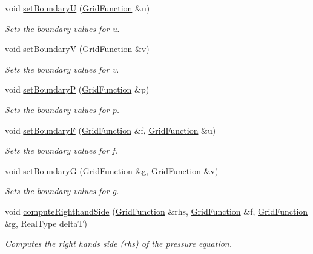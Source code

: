 \begin{DoxyCompactItemize}
void \hyperlink{class_computation_a9f8ae5f9990bc96f6cbe68e7965f8f5e}{set\-Boundary\-U} (\hyperlink{class_grid_function}{Grid\-Function} \&u)
\begin{DoxyCompactList}\small\item\em Sets the boundary values for u. \end{DoxyCompactList}\item 
void \hyperlink{class_computation_a95a948a82d9574cdee21e61bfca76f94}{set\-Boundary\-V} (\hyperlink{class_grid_function}{Grid\-Function} \&v)
\begin{DoxyCompactList}\small\item\em Sets the boundary values for v. \end{DoxyCompactList}\item 
void \hyperlink{class_computation_a43d0b65ed6493243d7a7eb6a47f0d93c}{set\-Boundary\-P} (\hyperlink{class_grid_function}{Grid\-Function} \&p)
\begin{DoxyCompactList}\small\item\em Sets the boundary values for p. \end{DoxyCompactList}\item 
void \hyperlink{class_computation_a9a5f1ebff2fb7f3fc4690c26b34ad2a8}{set\-Boundary\-F} (\hyperlink{class_grid_function}{Grid\-Function} \&f, \hyperlink{class_grid_function}{Grid\-Function} \&u)
\begin{DoxyCompactList}\small\item\em Sets the boundary values for f. \end{DoxyCompactList}\item 
void \hyperlink{class_computation_ae4105e9c89e6a8d28f79f13dcea1df26}{set\-Boundary\-G} (\hyperlink{class_grid_function}{Grid\-Function} \&g, \hyperlink{class_grid_function}{Grid\-Function} \&v)
\begin{DoxyCompactList}\small\item\em Sets the boundary values for g. \end{DoxyCompactList}\item 
void \hyperlink{class_computation_a6596833e2001d82c870fd09fa4d6d566}{compute\-Righthand\-Side} (\hyperlink{class_grid_function}{Grid\-Function} \&rhs, \hyperlink{class_grid_function}{Grid\-Function} \&f, \hyperlink{class_grid_function}{Grid\-Function} \&g, Real\-Type delta\-T)
\begin{DoxyCompactList}\small\item\em Computes the right hands side (rhs) of the pressure equation. \end{DoxyCompactList}\end{DoxyCompactItemize}
